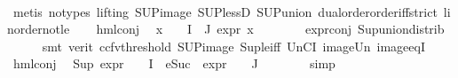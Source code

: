 \begin{isabellebody}
\ \ \ \ \isamarkupfalse%
\ {\isacharparenleft}{\kern0pt}metis\ {\isacharparenleft}{\kern0pt}no{\isacharunderscore}{\kern0pt}types{\isacharcomma}{\kern0pt}\ lifting{\isacharparenright}{\kern0pt}\ SUP{\isacharunderscore}{\kern0pt}image\ SUP{\isacharunderscore}{\kern0pt}lessD\ SUP{\isacharunderscore}{\kern0pt}union\ dual{\isacharunderscore}{\kern0pt}order{\isachardot}{\kern0pt}order{\isacharunderscore}{\kern0pt}iff{\isacharunderscore}{\kern0pt}strict\ linorder{\isacharunderscore}{\kern0pt}not{\isacharunderscore}{\kern0pt}le{\isacharparenright}{\kern0pt}\isanewline
\ \ \isamarkupfalse%
\ hml{\isacharunderscore}{\kern0pt}conj\ \isamarkupfalse%
\ {\isachardoublequoteopen}{\isasymforall}x\ {\isasymin}\ {\isacharparenleft}{\kern0pt}{\isasymPhi}\ {\isacharbackquote}{\kern0pt}\ {\isacharparenleft}{\kern0pt}I\ {\isasymunion}\ J{\isacharparenright}{\kern0pt}{\isacharparenright}{\kern0pt}{\isachardot}{\kern0pt}\ expr{\isacharunderscore}{\kern0pt}{}\ x\ {\isasymle}\ {}{\isachardoublequoteclose}\isanewline
\ \ \ \ \isamarkupfalse%
\ expr{\isacharunderscore}{\kern0pt}{}{\isacharunderscore}{\kern0pt}conj\ Sup{\isacharunderscore}{\kern0pt}union{\isacharunderscore}{\kern0pt}distrib\ \isanewline
\ \ \ \ \isamarkupfalse%
\ {\isacharparenleft}{\kern0pt}smt\ {\isacharparenleft}{\kern0pt}verit{\isacharcomma}{\kern0pt}\ ccfv{\isacharunderscore}{\kern0pt}threshold{\isacharparenright}{\kern0pt}\ SUP{\isacharunderscore}{\kern0pt}image\ Sup{\isacharunderscore}{\kern0pt}le{\isacharunderscore}{\kern0pt}iff\ UnCI\ image{\isacharunderscore}{\kern0pt}Un\ image{\isacharunderscore}{\kern0pt}eqI{\isacharparenright}{\kern0pt}\isanewline
\ \ \isamarkupfalse%
\ hml{\isacharunderscore}{\kern0pt}conj\ \isamarkupfalse%
\ {\isachardoublequoteopen}{\isacharparenleft}{\kern0pt}Sup\ {\isacharparenleft}{\kern0pt}{\isacharparenleft}{\kern0pt}expr{\isacharunderscore}{\kern0pt}{}\ {\isasymcirc}\ {\isasymPhi}{\isacharparenright}{\kern0pt}\ {\isacharbackquote}{\kern0pt}\ I\ {\isasymunion}\ {\isacharparenleft}{\kern0pt}{\isacharparenleft}{\kern0pt}eSuc\ {\isasymcirc}\ expr{\isacharunderscore}{\kern0pt}{}\ {\isasymcirc}\ {\isasymPhi}{\isacharparenright}{\kern0pt}\ {\isacharbackquote}{\kern0pt}\ J{\isacharparenright}{\kern0pt}{\isacharparenright}{\kern0pt}{\isacharparenright}{\kern0pt}\ {\isasymle}\ {}{\isachardoublequoteclose}\isanewline
\ \ \ \ \isamarkupfalse%
\ simp\isanewline
\ \ \isamarkupfalse%

\end{isabellebody}
